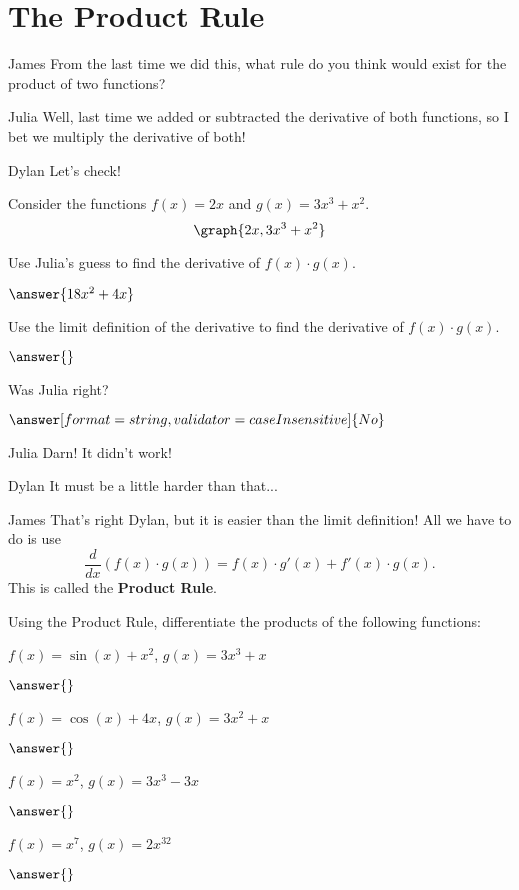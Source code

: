 \documentclass{ximera}
\begin{document}
\section{The Product Rule}
\begin{dialogue}
\item[James] From the last time we did this, what rule do you think would exist for the product of two functions?
\item[Julia] Well, last time we added or subtracted the derivative of both functions, so I bet we multiply the derivative of both!
\item[Dylan] Let's check!
\end{dialogue}
Consider the functions $f(x) = 2x$ and $g(x) = 3x^3 + x^2$.
\[
\graph{2x, 3x^3+x^2}
\]
\begin{question}
Use Julia's guess to find the derivative of $f(x) \cdot g(x)$.

$\answer{18x^2+4x}$

Use the limit definition of the derivative to find the derivative of $f(x) \cdot g(x)$.

$\answer{}$

Was Julia right?

$\answer[format=string,validator=caseInsensitive]{No}$
\end{question}
\begin{dialogue}
\item[Julia] Darn! It didn't work!
\item[Dylan] It must be a little harder than that...
\item[James] That's right Dylan, but it is easier than the limit definition! All we have to do is use $$\frac{d}{dx}\left(f(x)\cdot g(x)\right)= f(x)\cdot g'(x) + f'(x)\cdot g(x)\text{.}$$ This is called the \textbf{Product Rule}.
\end{dialogue}
\begin{question}
Using the Product Rule, differentiate the products of the following functions:

$f(x) = \sin(x)+x^2$, $g(x) = 3x^3+x$

$\answer{}$

$f(x) = \cos(x)+4x$, $g(x) = 3x^2+x$

$\answer{}$

$f(x) = x^2$, $g(x) = 3x^3-3x$

$\answer{}$

$f(x) = x^7$, $g(x) = 2x^{32}$

$\answer{}$

\end{question}
\end{document}

